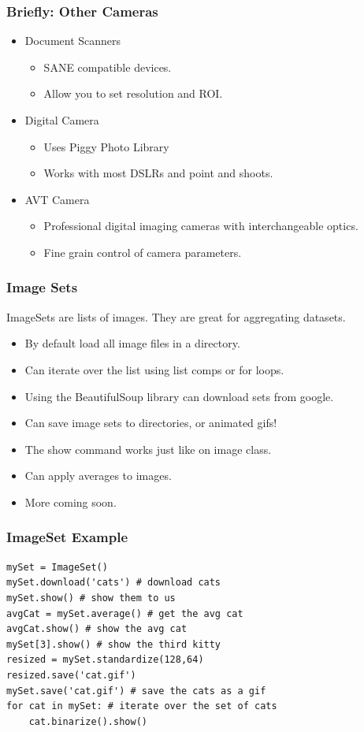 \documentclass{beamer}
\begin{document}
\begin{frame}
\frametitle{Briefly: Other Cameras}
\begin{itemize}
\item Document Scanners
\begin{itemize}
\item SANE compatible devices.
\item Allow you to set resolution and ROI. 
\end{itemize}
\item Digital Camera
\begin{itemize}
\item Uses Piggy Photo Library
\item Works with most DSLRs and point and shoots.
\end{itemize}
\item AVT Camera
\begin{itemize}
\item Professional digital imaging cameras with interchangeable optics.
\item Fine grain control of camera parameters. 
\end{itemize}
\end{itemize}
\end{frame}
\begin{frame}
\frametitle{Image Sets}
ImageSets are lists of images. They are great for aggregating datasets.
\begin{itemize}
\item By default load all image files in a directory.
\item Can iterate over the list using list comps or for loops.
\item Using the BeautifulSoup library can download sets from google.
\item Can save image sets to directories, or animated gifs!
\item The show command works just like on image class.
\item Can apply averages to images.
\item More coming soon.
\end{itemize}
\end{frame}

\begin{frame}[fragile] 
\frametitle{ImageSet Example}
\begin{example}
\begin{verbatim}
mySet = ImageSet()
mySet.download('cats') # download cats
mySet.show() # show them to us
avgCat = mySet.average() # get the avg cat
avgCat.show() # show the avg cat
mySet[3].show() # show the third kitty
resized = mySet.standardize(128,64)
resized.save('cat.gif')
mySet.save('cat.gif') # save the cats as a gif
for cat in mySet: # iterate over the set of cats
    cat.binarize().show()
\end{verbatim}
\end{example}
\end{frame}
\end{document}
